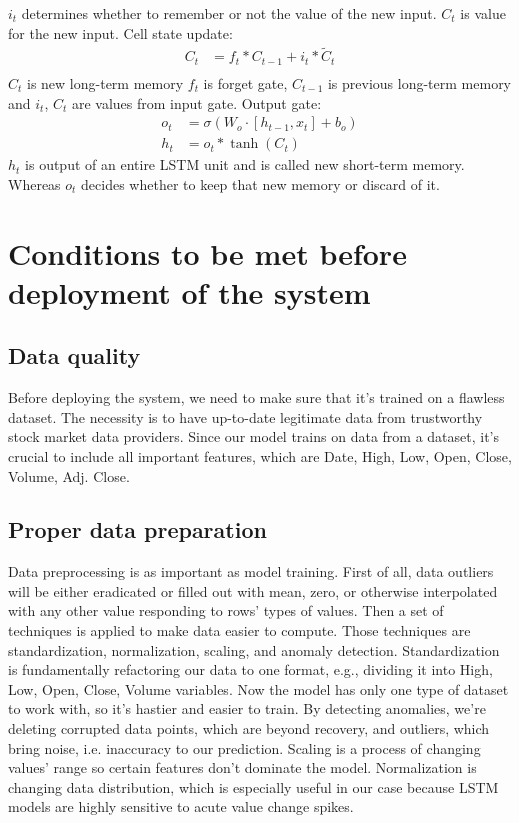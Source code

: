 \documentclass[10pt,twoside,english,a4paper]{article}
\begin{document}
$i_t$ determines whether to remember or not the value of the new input. $C_t$ is value for the new input.
\newline Cell state update:
\begin{align*}
    C_t &= f_t * C_{t-1} + i_t * \tilde{C}_t \\
\end{align*}
$C_t$ is new long-term memory $f_t$ is forget gate, $C_{t-1}$ is previous long-term memory and $i_t$, $C_t$ are values from input gate.
\newline Output gate:
\begin{align*}
    o_t &= \sigma(W_o \cdot [h_{t-1}, x_t] + b_o) \\
    h_t &= o_t * \tanh(C_t)
\end{align*}
$h_t$ is output of an entire LSTM unit and is called new short-term memory. Whereas $o_t$ decides whether to keep that new memory or discard of it.
\section{Conditions to be met before deployment of the system}
\subsection{Data quality}
Before deploying the system, we need to make sure that it's trained on a flawless dataset. The necessity is to have up-to-date legitimate data from trustworthy stock market data providers. Since our model trains on data from a dataset, it's crucial to include all important features, which are Date, High, Low, Open, Close, Volume, Adj. Close.\cite{data_quality}
\subsection{Proper data preparation}
Data preprocessing is as important as model training. First of all, data outliers will be either eradicated or filled out with mean, zero, or otherwise interpolated with any other value responding to rows' types of values. Then a set of techniques is applied to make data easier to compute. Those techniques are standardization, normalization, scaling, and anomaly detection.
Standardization is fundamentally refactoring our data to one format, e.g., dividing it into High, Low, Open, Close, Volume variables. Now the model has only one type of dataset to work with, so it's hastier and easier to train. By detecting anomalies, we're deleting corrupted data points, which are beyond recovery, and outliers, which bring noise, i.e. inaccuracy to our prediction. Scaling is a process of changing values' range so certain features don't dominate the model. Normalization is changing data distribution, which is especially useful in our case because LSTM models are highly sensitive to acute value change spikes.\cite{data_preproc_feature_sel_time_updates}
\end{document}
